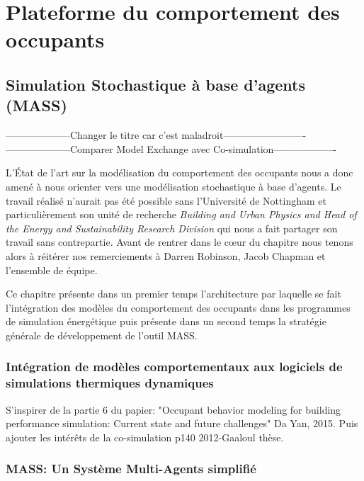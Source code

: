 \part{Plateforme du comportement des occupants}

\chapter{Simulation Stochastique à base d'agents (MASS)}
\label{MASS}

--------------------Changer le titre car c'est maladroit-------------------------
--------------------Comparer Model Exchange avec Co-simulation-------------------

L'État de l'art sur la modélisation du comportement des occupants nous a donc amené à nous orienter vers une modélisation stochastique à base d'agents. Le travail réalisé n'aurait pas été possible sans l'Université de Nottingham et particulièrement son unité de recherche \textit{Building and Urban Physics and Head of the Energy and Sustainability Research Division} qui nous a fait partager son travail sans contrepartie. Avant de rentrer dans le cœur du chapitre nous tenons alors à réitérer nos remerciements à Darren Robinson, Jacob Chapman et l'ensemble de équipe. 

Ce chapitre présente dans un premier temps l'architecture par laquelle se fait l'intégration des modèles du comportement des occupants dans les programmes de simulation énergétique puis présente dans un second temps la stratégie générale de développement de l'outil MASS.

\section{Intégration de modèles comportementaux aux logiciels de simulations thermiques dynamiques}

S'inspirer de la partie 6 du papier: "Occupant behavior modeling for building performance simulation: Current state and future challenges"  Da Yan, 2015. Puis ajouter les intérêts de la co-simulation p140 2012-Gaaloul thèse.



\section{MASS: Un Système Multi-Agents simplifié}

